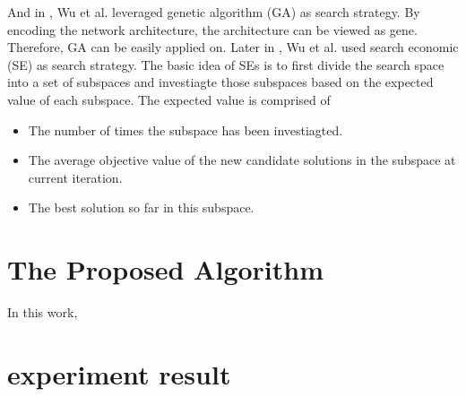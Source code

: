 \documentclass[sigconf]{acmart}
\begin{document}
    And in \cite{10.1145/3491396.3506510}, Wu et al. leveraged genetic algorithm (GA) as search strategy. 
    By encoding the network architecture, the architecture can be viewed as gene. Therefore, GA can be 
    easily applied on. 
    Later in \cite{10092788}, Wu et al. used search economic (SE) \cite{7379579} as search strategy. The 
    basic idea of SEs is to first divide the search space into a set of subspaces and investiagte those 
    subspaces based on the expected value of each subspace. The expected value is comprised of 
    \begin{itemize}
        \item The number of times the subspace has been investiagted. 
        \item The average objective value of the new candidate solutions in the subspace at current iteration. 
        \item The best solution so far in this subspace. 
    \end{itemize}

    \section{The Proposed Algorithm}
    \label{sec:proposed}
    In this work, 


    \section{experiment result}
    \label{sec:results} 
\end{document}
